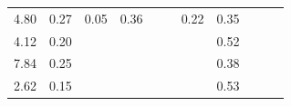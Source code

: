 \begin{refsection}[referencesCh3]
\begin{table}
\begin{adjustbox}{scale=0.8,center}
\begin{tabular}{@{}ccccccccccc@{}}
		4.80                                                         & 0.27                                                & 0.05                                                & 0.36                                                &                                                     &                                                      & 0.22                                                & 0.35                                                  &                                                         &                                                      & \cite{Seppala}                                  \\
		4.12                                                         & 0.20                                                &                                                     &                                                     &                                                     &                                                      &                                                     & 0.52                                                  &                                                         &                                                      & \cite{Alburquerque}                   \\
		7.84                                                         & 0.25                                                &                                                     &                                                     &                                                     &                                                      &                                                     & 0.38                                                  &                                                         &                                                      & \cite{Alburquerque}                             \\
		2.62                                                         & 0.15                                                &                                                     &                                                     &                                                     &                                                      &                                                     & 0.53                                                  &                                                         &                                                      & \cite{Alburquerque}                             \\

\end{tabular}
\end{adjustbox}
\end{table}
\end{refsection}
